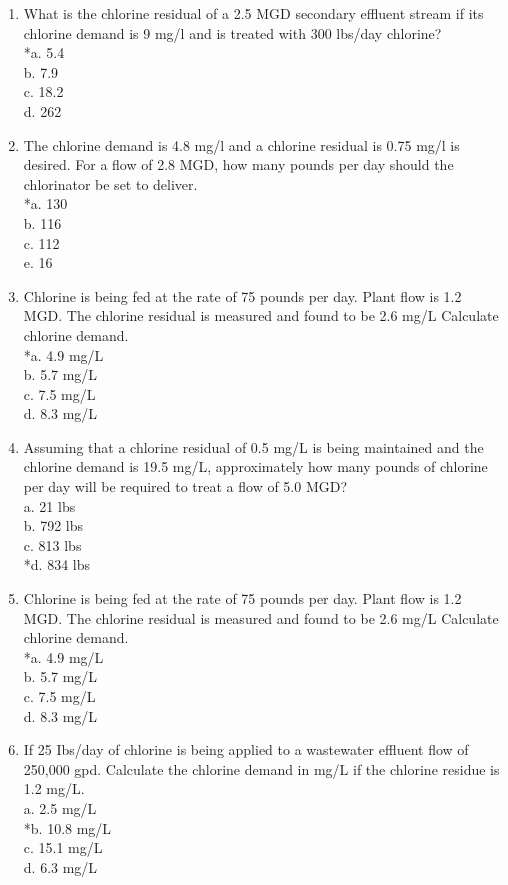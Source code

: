 \documentclass{article}
\begin{document}
\begin{enumerate}
\item What is the chlorine residual of a 2.5 MGD secondary effluent stream if its chlorine demand is 9 mg/l and is treated with 300 lbs/day chlorine?\\
*a. 5.4\\
b. 7.9\\
c. 18.2\\
d. 262


\item The chlorine demand is 4.8 mg/l and a chlorine residual is 0.75 mg/l is desired.  For a flow of 2.8 MGD, how many pounds per day should the chlorinator be set to deliver.\\

*a. 130 \\
b. 116 \\
c. 112 \\
e. 16 \\


\item Chlorine is being fed at the rate of 75 pounds per day. Plant flow is 1.2 MGD. The chlorine residual is measured and found to be 2.6 mg/L Calculate chlorine demand.\\
*a. 4.9 mg/L\\ 
b. 5.7 mg/L \\
c. 7.5 mg/L \\
d. 8.3 mg/L 

\item Assuming that a chlorine residual of 0.5 mg/L is being maintained and the chlorine demand is 19.5 mg/L, approximately how many pounds of chlorine per day will be required to treat a flow of 5.0 MGD?\\

a. 21 lbs \\
b. 792 lbs \\
c. 813 lbs \\
*d. 834 lbs 


\item Chlorine is being fed at the rate of 75 pounds per day. Plant flow is 1.2 MGD. The chlorine residual is measured and found to be 2.6 mg/L Calculate chlorine demand.\\
*a. 4.9 mg/L \\
b. 5.7 mg/L \\
c. 7.5 mg/L \\
d. 8.3 mg/L 


\item If 25 Ibs/day of chlorine is being applied to a wastewater effluent flow of 250,000 gpd. Calculate the chlorine demand in mg/L if the chlorine residue is 1.2 mg/L.\\
a. 2.5 mg/L \\
*b. 10.8 mg/L \\
c. 15.1 mg/L \\
d. 6.3 mg/L \\



\end{enumerate}
\end{document}
